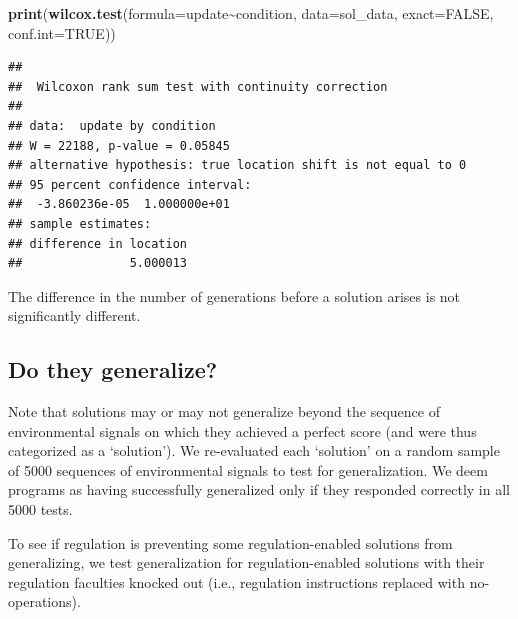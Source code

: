 \documentclass[
]{book}
\newenvironment{Shaded}{\begin{snugshade}}{\end{snugshade}}
\newcommand{\DataTypeTok}[1]{\textcolor[rgb]{0.13,0.29,0.53}{#1}}
\newcommand{\KeywordTok}[1]{\textcolor[rgb]{0.13,0.29,0.53}{\textbf{#1}}}
\newcommand{\NormalTok}[1]{#1}
\newcommand{\OperatorTok}[1]{\textcolor[rgb]{0.81,0.36,0.00}{\textbf{#1}}}
\newcommand{\OtherTok}[1]{\textcolor[rgb]{0.56,0.35,0.01}{#1}}
\begin{document}
\begin{Shaded}
\begin{Highlighting}[]
\KeywordTok{print}\NormalTok{(}\KeywordTok{wilcox.test}\NormalTok{(}\DataTypeTok{formula=}\NormalTok{update}\OperatorTok{\textasciitilde{}}\NormalTok{condition, }\DataTypeTok{data=}\NormalTok{sol\_data, }\DataTypeTok{exact=}\OtherTok{FALSE}\NormalTok{, }\DataTypeTok{conf.int=}\OtherTok{TRUE}\NormalTok{))}
\end{Highlighting}
\end{Shaded}

\begin{verbatim}
## 
##  Wilcoxon rank sum test with continuity correction
## 
## data:  update by condition
## W = 22188, p-value = 0.05845
## alternative hypothesis: true location shift is not equal to 0
## 95 percent confidence interval:
##  -3.860236e-05  1.000000e+01
## sample estimates:
## difference in location 
##               5.000013
\end{verbatim}

The difference in the number of generations before a solution arises is not significantly different.

\hypertarget{do-they-generalize}{%
\subsection{Do they generalize?}\label{do-they-generalize}}

Note that solutions may or may not generalize beyond the sequence of environmental signals on which they achieved a perfect score (and were thus categorized as a `solution').
We re-evaluated each `solution' on a random sample of 5000 sequences of environmental signals to test for generalization.
We deem programs as having successfully generalized only if they responded correctly in all 5000 tests.

To see if regulation is preventing some regulation-enabled solutions from generalizing, we test generalization for regulation-enabled solutions with their regulation faculties knocked out (i.e., regulation instructions replaced with no-operations).
\end{document}
